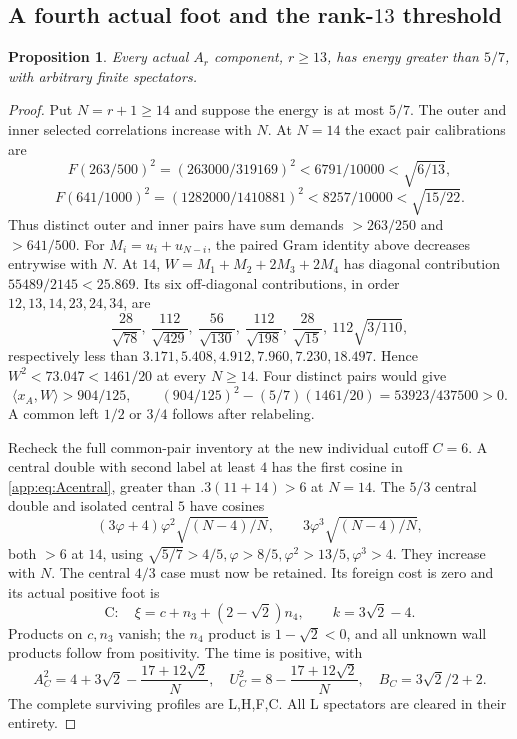 \documentclass[11pt]{article}
\newtheorem{proposition}[theorem]{Proposition}
\theoremstyle{definition}
\theoremstyle{remark}
\newcommand{\ip}[2]{\langle #1,#2\rangle}
\begin{document}
\subsection[A fourth actual foot and the rank-13 threshold]{A fourth actual foot and the rank-\(13\) threshold}
\label{app:Afivesevenths}
\begin{proposition}
Every actual \(A_r\) component, \(r\geq13\), has energy
greater than \(5/7\), with arbitrary finite spectators.
\end{proposition}
\begin{proof}
Put \(N=r+1\geq14\) and suppose the energy is at most \(5/7\).
The outer and inner selected correlations increase with \(N\).
At \(N=14\) the exact pair calibrations are
\[
 F(263/500)^2=(263000/319169)^2
  <6791/10000<\sqrt{6/13},
\]
\[
 F(641/1000)^2=(1282000/1410881)^2
  <8257/10000<\sqrt{15/22}.
\]
Thus distinct outer and inner pairs have sum demands
\(>263/250\) and \(>641/500\).
For \(M_i=u_i+u_{N-i}\), the paired Gram identity above
decreases entrywise with \(N\).
At \(14\), \(W=M_1+M_2+2M_3+2M_4\) has diagonal
contribution \(55489/2145<25.869\). Its six off-diagonal
contributions, in order \(12,13,14,23,24,34\), are
\[
 \frac{28}{\sqrt{78}},\
 \frac{112}{\sqrt{429}},\
 \frac{56}{\sqrt{130}},\
 \frac{112}{\sqrt{198}},\
 \frac{28}{\sqrt{15}},\
 112\sqrt{3/110},
\]
respectively less than
\(3.171,5.408,4.912,7.960,7.230,18.497\).
Hence \(W^2<73.047<1461/20\) at every \(N\geq14\).
Four distinct pairs would give
\[
 \ip{x_A}{W}>904/125,\qquad
 (904/125)^2-(5/7)(1461/20)=53923/437500>0.
\]
A common left \(1/2\) or \(3/4\) follows after relabeling.

Recheck the full common-pair inventory at the new
individual cutoff \(C=6\). A central double with second
label at least \(4\) has the first cosine in
\eqref{app:eq:Acentral}, greater than
\(.3(11+14)>6\) at \(N=14\).
The \(5/3\) central double and isolated central \(5\)
have cosines
\[
 (3\varphi+4)\varphi^2\sqrt{(N-4)/N},
 \qquad3\varphi^3\sqrt{(N-4)/N},
\]
both \(>6\) at \(14\), using
\(\sqrt{5/7}>4/5,\varphi>8/5,\varphi^2>13/5,\varphi^3>4\).
They increase with \(N\).
The central \(4/3\) case must now be retained.
Its foreign cost is zero and its actual positive foot is
\[
 \mathrm C:\quad\xi=c+n_3+(2-\sqrt2)n_4,\qquad k=3\sqrt2-4.
\]
Products on \(c,n_3\) vanish; the \(n_4\) product is
\(1-\sqrt2<0\), and all unknown wall products follow
from positivity. The time is positive, with
\[
 A_C^2=4+3\sqrt2-\frac{17+12\sqrt2}{N},\quad
 U_C^2=8-\frac{17+12\sqrt2}{N},\quad B_C=3\sqrt2/2+2.
\]
The complete surviving profiles are L,H,F,C.
All L spectators are cleared in their entirety.


\end{proof}
\end{document}
